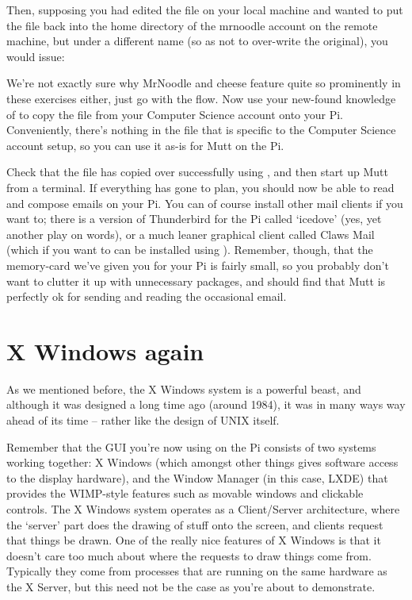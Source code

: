 Then, supposing you had edited the file  on your local machine and wanted to put the file back into the home directory of the mrnoodle account on the remote machine, but under a different name (so as not to over-write the original), you would issue:


We're not exactly sure why MrNoodle and cheese feature quite so prominently in these exercises either, just go with the flow. Now use your new-found knowledge of  to copy the  file from your Computer Science account onto your Pi. Conveniently, there's nothing in the  file that is specific to the Computer Science account setup, so you can use it as-is for Mutt on the Pi. 

Check that the file has copied over successfully using , and then start up Mutt from a terminal. If everything has gone to plan, you should now be able to read and compose emails on your Pi. You can of course install other mail clients if you want to; there is a version of Thunderbird for the Pi called `icedove' (yes, yet another play on words), or a much leaner graphical client called Claws Mail (which if you want to can be installed using ). Remember, though, that the memory-card we've given you for your Pi is fairly small, so you probably don't want to clutter it up with unnecessary packages, and should find that Mutt is perfectly ok for sending and reading the occasional email. 

\section{X Windows again}

As we mentioned before, the X Windows system is a powerful beast, and although it was designed a long time ago (around 1984), it was in many ways way ahead of its time -- rather like the design of UNIX itself.

Remember that the GUI you're now using on the Pi consists of two systems working together: X Windows (which amongst other things gives software access to the display hardware), and the Window Manager (in this case, LXDE) that provides the WIMP-style features such as movable windows and clickable controls. The X Windows system operates as a Client/Server architecture, where the `server' part does the drawing of stuff onto the screen, and clients request that things be drawn. One of the really nice features of X Windows is that it doesn't care too much about where the requests to draw things come from. Typically they come from processes that are running on the same hardware as the X Server, but this need not be the case as you're about to demonstrate.

